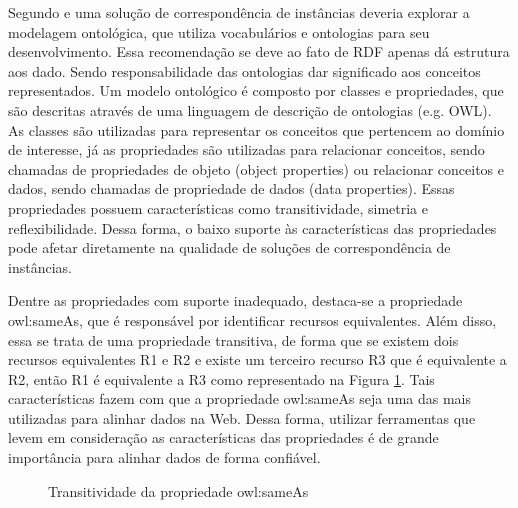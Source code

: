 Segundo \cite{homoceanu2014putting} e \cite{ferrara2008towards} uma solução de correspondência de instâncias deveria explorar a modelagem ontológica, que utiliza vocabulários e ontologias para seu desenvolvimento. Essa recomendação se deve ao fato de RDF apenas dá estrutura aos dado. Sendo responsabilidade das ontologias dar significado aos conceitos representados. Um modelo ontológico é composto por classes e propriedades, que são descritas através de uma linguagem de descrição de ontologias (e.g. OWL). As classes são utilizadas para representar os conceitos que pertencem ao domínio de interesse, já as propriedades são utilizadas para relacionar conceitos, sendo chamadas de propriedades de objeto (object properties) ou relacionar conceitos e dados, sendo chamadas de propriedade de dados (data properties). Essas propriedades possuem características como transitividade, simetria e reflexibilidade. Dessa forma, o baixo suporte às características das propriedades pode afetar diretamente na qualidade de soluções de correspondência de instâncias. 
        
Dentre as propriedades com suporte inadequado,  destaca-se a propriedade owl:sameAs, que é responsável por identificar recursos equivalentes. Além disso, essa se trata de uma propriedade transitiva, de forma que se existem dois recursos equivalentes R1 e R2 e existe um terceiro recurso R3 que é equivalente a R2, então R1 é equivalente a R3 como representado na Figura \ref{sameAsSample}. Tais características fazem com que a propriedade owl:sameAs seja uma das  mais utilizadas para alinhar dados na Web. Dessa forma, utilizar ferramentas que levem em consideração as características das propriedades é de grande importância para alinhar dados de forma confiável.


\begin{figure}[h]
	\centering
		\caption{Transitividade da propriedade owl:sameAs}
		\label{sameAsSample}
\end{figure}


